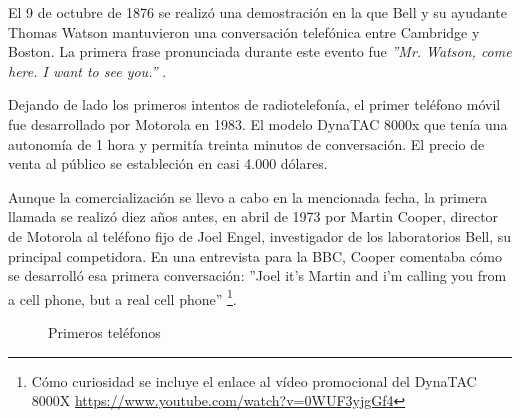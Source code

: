 El 9 de octubre de 1876 se realizó una demostración en la que Bell y su ayudante Thomas Watson mantuvieron una conversación telefónica entre Cambridge y Boston. La primera frase pronunciada durante este evento fue \textit{''Mr. Watson, come here. I want to see you.''} \cite{Even01}.

Dejando de lado los primeros intentos de radiotelefonía, el primer teléfono móvil fue desarrollado por Motorola en 1983. El modelo \ac{DynaTAC} 8000x que tenía una autonomía de 1 hora y permitía treinta minutos de conversación. El precio de venta al público se estableción en casi 4.000 dólares.

Aunque la comercialización se llevo a cabo en la  mencionada fecha, la primera llamada se realizó diez años antes, en abril de 1973 por Martin Cooper, director de Motorola al teléfono fijo de Joel Engel, investigador de los laboratorios Bell, su principal competidora. En una entrevista para la BBC, Cooper comentaba cómo se desarrolló esa primera conversación: ''Joel it's Martin and i'm calling you from a cell phone, but a real cell phone'' \cite{BBC13}\footnote{Cómo curiosidad se incluye el enlace al vídeo promocional del DynaTAC 8000X \url{https://www.youtube.com/watch?v=0WUF3yjgGf4}}.

\begin{figure}[h!btp]
	\begin{adjustbox}{minipage=\linewidth, fbox}
		\centering
		\hspace{10mm}
	\end{adjustbox}
\caption{Primeros teléfonos}
	\label{fig:primeros-telefonos2}
\end{figure}

